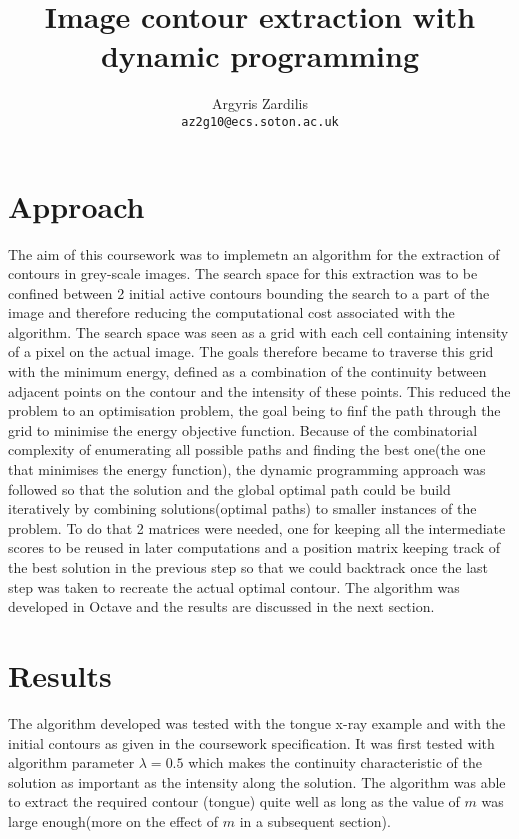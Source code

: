 \documentclass[a4paper,12pt]{article}
\author{Argyris Zardilis\\ \texttt{az2g10@ecs.soton.ac.uk}}
\title{Image contour extraction with dynamic programming}
\begin{document}
\maketitle

\section{Approach}
The aim of this coursework was to implemetn an algorithm for the extraction of contours in grey-scale images. The search space for this extraction was to be confined between 2 initial active contours bounding the search to a part of the image and therefore reducing the computational cost associated with the algorithm. The search space was seen as a grid with each cell containing intensity of a pixel on the actual image. The goals therefore became to traverse this grid with the minimum energy, defined as a combination of the continuity between adjacent points on the contour and the intensity of these points. This reduced the problem to an optimisation problem, the goal being to finf the path through the grid to minimise the energy objective function. Because of the combinatorial complexity of enumerating all possible paths and finding the best one(the one that minimises the energy function), the dynamic programming approach was followed so that the solution and the global optimal path could be build iteratively by combining solutions(optimal paths) to smaller instances of the problem. To do that 2 matrices were needed, one for keeping all the intermediate scores to be reused in later computations and a position matrix keeping track of the best solution in the previous step so that we could backtrack once the last step was taken to recreate the actual optimal contour. The algorithm was developed in Octave and the results are discussed in the next section.
\section{Results}
The algorithm developed was tested with the tongue x-ray example and with the initial contours as given in the coursework specification. It was first tested with algorithm parameter $\lambda=0.5$ which makes the continuity characteristic of the solution as important as the intensity along the solution. The algorithm was able to extract the required contour (tongue) quite well as long as the value of $m$ was large enough(more on the effect of $m$ in a subsequent section). 
\end{document}
